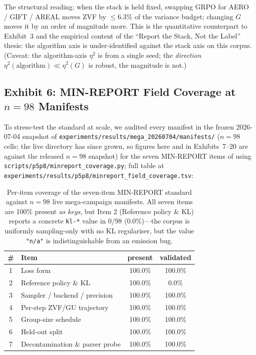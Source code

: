 The structural reading: when the stack is held fixed, swapping GRPO for
AERO / GIFT / AREAL moves ZVF by $\le 6.3\%$ of the variance budget;
changing $G$ moves it by an order of magnitude more. This is the
quantitative counterpart to Exhibit~3 and the empirical content of the
``Report the Stack, Not the Label'' thesis: the algorithm axis is
under-identified against the stack axis on this corpus. (Caveat: the
algorithm-axis $\eta^{2}$ is from a single seed; the \emph{direction}
$\eta^{2}(\text{algorithm}) \ll \eta^{2}(G)$ is robust, the magnitude
is not.)

\subsection{Exhibit 6: MIN-REPORT Field Coverage at $n=98$ Manifests}
\label{sec:p5-exhibit-coverage}
To stress-test the standard at scale, we audited every manifest in the frozen
2026-07-04 snapshot of
\texttt{experiments/results/mega\_20260704/manifests/} ($n=98$ cells; the live
directory has since grown, so figures here and in Exhibits~7--20 are against the
released $n=98$ snapshot) for
the seven MIN-REPORT items of  using
\texttt{scripts/p5p8/minreport\_coverage.py}; full table at
\texttt{experiments/results/p5p8/minreport\_field\_coverage.tsv}:

\begin{table}[t]
\centering
\caption{Per-item coverage of the seven-item MIN-REPORT standard against
$n=98$ live mega-campaign manifests. All seven items are 100\% present
\emph{as keys}, but Item 2 (Reference policy \& KL) reports a concrete
\texttt{kl-*} value in $0/98$ ($0.0\%$)---the corpus is uniformly
sampling-only with no KL regulariser, but the value \texttt{"n/a"} is
indistinguishable from an emission bug.}
\label{tab:p5-coverage}
\small
\begin{tabular}{@{}clcc@{}}
\toprule
\# & Item & present & validated \\
\midrule
1 & Loss form              & 100.0\% & 100.0\% \\
2 & Reference policy \& KL & 100.0\% &   0.0\% \\
3 & Sampler / backend / precision & 100.0\% & 100.0\% \\
4 & Per-step ZVF/GU trajectory   & 100.0\% & 100.0\% \\
5 & Group-size schedule          & 100.0\% & 100.0\% \\
6 & Held-out split               & 100.0\% & 100.0\% \\
7 & Decontamination \& parser probe & 100.0\% & 100.0\% \\
\bottomrule
\end{tabular}
\end{table}

